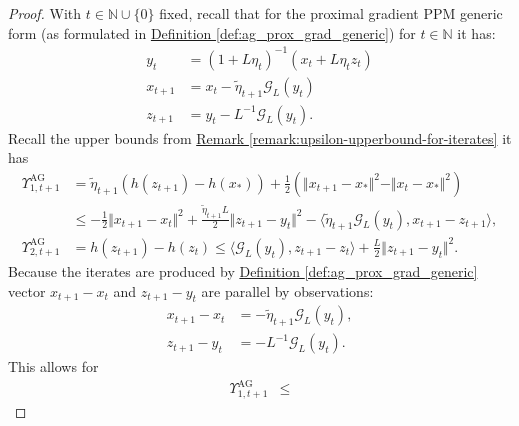 \documentclass[12pt]{article}
\begin{document}
    \begin{proof}
        With $t \in \mathbb N \cup \{0\}$ fixed, 
        recall that for the proximal gradient PPM generic form 
        (as formulated in 
        \hyperref[def:ag_prox_grad_generic]{Definition \ref*{def:ag_prox_grad_generic}}) 
        for $t\in \mathbb N$ it has: 
        \begin{align*}
            y_t &= (1 + L\eta_t)^{-1}(x_t + L\eta_t z_t)
            \\
            x_{t + 1} &= x_t - \tilde \eta_{t + 1} \mathcal G_L(y_t)
            \\
            z_{t + 1} &= y_t - L^{-1}\mathcal G_L(y_t). 
        \end{align*}
        Recall the upper bounds from 
        \hyperref[remark:upsilon-upperbound-for-iterates]
        {Remark \ref*{remark:upsilon-upperbound-for-iterates}}
        it has 
        \begin{align*}
            \Upsilon_{1, t + 1}^\text{AG}
            &= 
            \tilde\eta_{t + 1} (h(z_{t + 1}) - h(x_*)) + 
            \frac{1}{2} (
                \Vert x_{t + 1} - x_*\Vert^2
                - 
                \Vert x_t - x_*\Vert^2
            )
            \\
            &\le 
            - \frac{1}{2}\Vert x_{t + 1} - x_t\Vert^2 
            + \frac{\tilde\eta_{t + 1}L}{2}\Vert z_{t + 1} - y_t\Vert^2
            - \langle 
                \tilde\eta_{t + 1} \mathcal G_L(y_t), 
                x_{t + 1} - z_{t + 1}
            \rangle, 
            \\
            \Upsilon_{2, t + 1}^\text{AG}
            &= 
            h(z_{t + 1}) - h(z_t) 
            \le 
            \langle \mathcal G_L(y_t), z_{t + 1} - z_t\rangle + 
            \frac{L}{2}\Vert z_{t + 1} - y_t\Vert^2. 
        \end{align*}
        Because the iterates are produced by 
        \hyperref[def:ag_prox_grad_generic]
        {Definition \ref*{def:ag_prox_grad_generic}}
        vector $x_{t + 1} - x_t$ and $z_{t + 1} - y_t$ are parallel by observations: 
        \begin{align*}
            x_{t + 1} - x_t &= -\tilde\eta_{t + 1}\mathcal G_L(y_t), 
            \\
            z_{t + 1} - y_t &= -L^{-1}\mathcal G_L(y_t). 
        \end{align*}
        This allows for 
        \begin{align*}
            \Upsilon_{1, t + 1}^{\text{AG}} 
            &\le 

\end{align*}
\end{proof}
\end{document}
